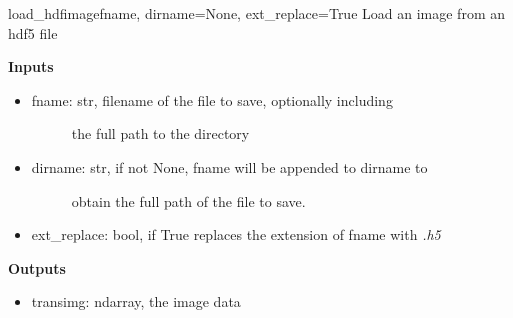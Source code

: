 \documentclass[letterpaper,10pt,english]{manual}
\begin{document}
\hypertarget{imageio.load_hdfimage}{}\begin{funcdesc}{load\_hdfimage}{fname, dirname=None, ext\_replace=True}
Load an image from an hdf5 file

\textbf{Inputs}
\begin{itemize}
\item {} \begin{description}
\item[fname: str, filename of the file to save, optionally including]
the full path to the directory

\end{description}

\item {} \begin{description}
\item[dirname: str, if not None, fname will be appended to dirname to]
obtain the full path of the file to save.

\end{description}

\item {} 
ext\_replace: bool, if True replaces the extension of fname with \emph{.h5}

\end{itemize}

\textbf{Outputs}
\begin{itemize}
\item {} 
transimg: ndarray, the image data

\end{itemize}
\end{funcdesc}
\end{document}
